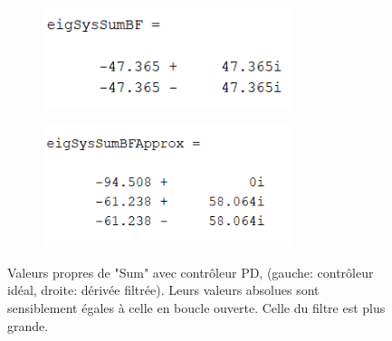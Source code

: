 \documentclass{report}
\begin{document}
\begin{figure}[h]  %
    \begin{subfigure}{.5\textwidth}
        \centering
        \includegraphics[width=0.8\textwidth]{figures/eigSysSumBF.png}        
      \end{subfigure}    
      \begin{subfigure}{.5\textwidth}
        \centering
        \includegraphics[width=0.8\textwidth]{figures/eigSysSumBFApprox.png}
      \end{subfigure}    
      \caption{Valeurs propres de "Sum" avec contrôleur PD, 
      (gauche: contrôleur idéal, droite: dérivée filtrée).
      Leurs valeurs absolues sont sensiblement égales à
      celle en boucle ouverte.
      Celle du filtre est plus grande.}
\end{figure}
\end{document}
